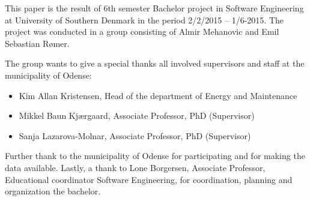 This paper is the result of 6th semester Bachelor project in Software Engineering at University of Southern Denmark in the period 2/2/2015 – 1/6-2015.
The project was conducted in a group consisting of Almir Mehanovic and Emil Sebastian Rømer.

The group wants to give a special thanks all involved supervisors and staff at the municipality of Odense:
\begin{itemize}
  \item Kim Allan Kristensen,     Head of the department of Energy and Maintenance
  \item Mikkel Baun Kjærgaard,     Associate Professor, PhD     (Supervisor)
  \item  Sanja Lazarova-Molnar,     Associate Professor, PhD      (Supervisor)
\end{itemize}
Further thank to the municipality of Odense for participating and for making the data available.
Lastly, a thank to Lone Borgersen, Associate Professor, Educational coordinator Software Engineering, for coordination, planning and organization the bachelor.